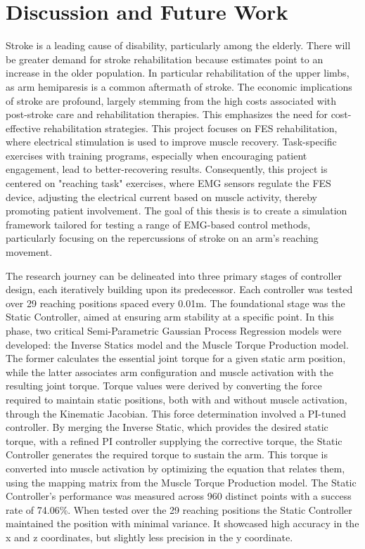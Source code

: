 \chapter{Discussion and Future Work}

Stroke is a leading cause of disability, particularly among the elderly. There will be greater demand for stroke rehabilitation because estimates point to an increase in the older population. In particular rehabilitation of the upper limbs, as arm hemiparesis is a common aftermath of stroke. The economic implications of stroke are profound, largely stemming from the high costs associated with post-stroke care and rehabilitation therapies. This emphasizes the need for cost-effective rehabilitation strategies. This project focuses on FES rehabilitation, where electrical stimulation is used to improve muscle recovery. Task-specific exercises with training programs, especially when encouraging patient engagement, lead to better-recovering results. Consequently, this project is centered on "reaching task" exercises, where EMG sensors regulate the FES device, adjusting the electrical current based on muscle activity, thereby promoting patient involvement. The goal of this thesis is to create a simulation framework tailored for testing a range of EMG-based control methods, particularly focusing on the repercussions of stroke on an arm's reaching movement.

The research journey can be delineated into three primary stages of controller design, each iteratively building upon its predecessor. Each controller was tested over 29 reaching positions spaced every 0.01m. The foundational stage was the Static Controller, aimed at ensuring arm stability at a specific point. In this phase, two critical Semi-Parametric Gaussian Process Regression models were developed: the Inverse Statics model and the Muscle Torque Production model. The former calculates the essential joint torque for a given static arm position, while the latter associates arm configuration and muscle activation with the resulting joint torque. Torque values were derived by converting the force required to maintain static positions, both with and without muscle activation, through the Kinematic Jacobian. This force determination involved a PI-tuned controller. By merging the Inverse Static, which provides the desired static torque, with a refined PI controller supplying the corrective torque, the Static Controller generates the required torque to sustain the arm. This torque is converted into muscle activation by optimizing the equation that relates them, using the mapping matrix from the Muscle Torque Production model. The Static Controller's performance was measured across 960 distinct points with a success rate of 74.06\%. When tested over the 29 reaching positions the Static Controller maintained the position with minimal variance. It showcased high accuracy in the x and z coordinates, but slightly less precision in the y coordinate.

